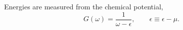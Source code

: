 \documentclass{article}
\begin{document}
Energies are measured from the chemical potential,
\begin{equation}
G(\omega) = \frac{1}{\omega - \epsilon}, \qquad \epsilon \equiv \epsilon - \mu .
\label{eq:g}
\end{equation}
\end{document}
